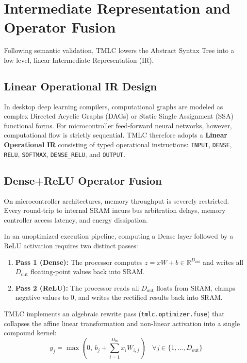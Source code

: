 \documentclass[11pt,a4paper]{article}
\begin{document}
\section{Intermediate Representation and Operator Fusion}
\label{sec:ir_opt}

Following semantic validation, TMLC lowers the Abstract Syntax Tree into a low-level, linear Intermediate Representation (IR).

\subsection{Linear Operational IR Design}
In desktop deep learning compilers, computational graphs are modeled as complex Directed Acyclic Graphs (DAGs) or Static Single Assignment (SSA) functional forms. For microcontroller feed-forward neural networks, however, computational flow is strictly sequential. TMLC therefore adopts a \textbf{Linear Operational IR} consisting of typed operational instructions: \texttt{INPUT}, \texttt{DENSE}, \texttt{RELU}, \texttt{SOFTMAX}, \texttt{DENSE\_RELU}, and \texttt{OUTPUT}.

\subsection{Dense+ReLU Operator Fusion}
On microcontroller architectures, memory throughput is severely restricted. Every round-trip to internal SRAM incurs bus arbitration delays, memory controller access latency, and energy dissipation.

In an unoptimized execution pipeline, computing a Dense layer followed by a ReLU activation requires two distinct passes:
\begin{enumerate}
    \item \textbf{Pass 1 (Dense):} The processor computes $z = x W + b \in \mathbb{R}^{D_{\text{out}}}$ and writes all $D_{\text{out}}$ floating-point values back into SRAM.
    \item \textbf{Pass 2 (ReLU):} The processor reads all $D_{\text{out}}$ floats from SRAM, clamps negative values to $0$, and writes the rectified results back into SRAM.
\end{enumerate}

TMLC implements an algebraic rewrite pass (\texttt{tmlc.optimizer.fuse}) that collapses the affine linear transformation and non-linear activation into a single compound kernel:
\begin{equation}
    y_j = \max\left(0, \ b_j + \sum_{i=1}^{D_{\text{in}}} x_i W_{i, j}\right) \quad \forall j \in \{1, \dots, D_{\text{out}}\}
\end{equation}
\end{document}
